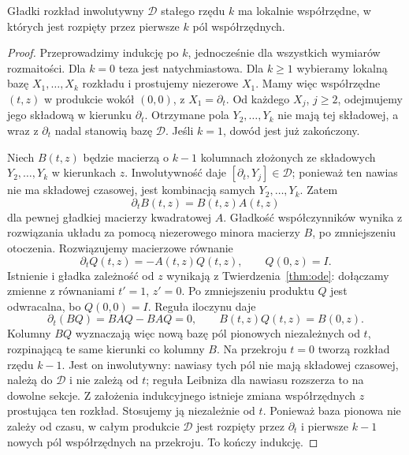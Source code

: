 \begin{stwierdzenie}
\label{prop:frobenius-lokalny}
Gładki rozkład inwolutywny $\mathcal D$ stałego rzędu $k$
ma lokalnie współrzędne, w których jest rozpięty przez pierwsze
$k$ pól współrzędnych.
\end{stwierdzenie}
\begin{proof}
Przeprowadzimy indukcję po $k$, jednocześnie dla wszystkich
wymiarów rozmaitości. Dla $k=0$ teza jest natychmiastowa.
Dla $k\ge1$ wybieramy lokalną bazę $X_1,\ldots,X_k$ rozkładu
i prostujemy niezerowe $X_1$. Mamy więc współrzędne $(t,z)$
w produkcie wokół $(0,0)$, z $X_1=\partial_t$.
Od każdego $X_j$, $j\ge2$, odejmujemy jego składową w kierunku
$\partial_t$. Otrzymane pola $Y_2,\ldots,Y_k$ nie mają tej
składowej, a wraz z $\partial_t$ nadal stanowią bazę $\mathcal D$.
Jeśli $k=1$, dowód jest już zakończony.

Niech $B(t,z)$ będzie macierzą o $k-1$ kolumnach złożonych
ze składowych $Y_2,\ldots,Y_k$ w kierunkach $z$.
Inwolutywność daje $[\partial_t,Y_j]\in\mathcal D$;
ponieważ ten nawias nie ma składowej czasowej, jest kombinacją
samych $Y_2,\ldots,Y_k$. Zatem
\[
 \partial_tB(t,z)=B(t,z)A(t,z)
\]
dla pewnej gładkiej macierzy kwadratowej $A$.
Gładkość współczynników wynika z rozwiązania układu za pomocą
niezerowego minora macierzy $B$, po zmniejszeniu otoczenia.
Rozwiązujemy macierzowe równanie
\[
 \partial_tQ(t,z)=-A(t,z)Q(t,z),\qquad Q(0,z)=I.
\]
Istnienie i gładka zależność od $z$ wynikają z
Twierdzenia~\ref{thm:ode}: dołączamy zmienne z równaniami
$t'=1$, $z'=0$. Po zmniejszeniu produktu $Q$ jest odwracalna,
bo $Q(0,0)=I$. Reguła iloczynu daje
\[
 \partial_t(BQ)=BAQ-BAQ=0,\qquad B(t,z)Q(t,z)=B(0,z).
\]
Kolumny $BQ$ wyznaczają więc nową bazę pól pionowych
niezależnych od $t$, rozpinającą te same kierunki co kolumny $B$.
Na przekroju $t=0$ tworzą rozkład rzędu $k-1$.
Jest on inwolutywny: nawiasy tych pól nie mają składowej
czasowej, należą do $\mathcal D$ i nie zależą od $t$;
reguła Leibniza dla nawiasu rozszerza to na dowolne sekcje.
Z założenia indukcyjnego istnieje zmiana współrzędnych $z$
prostująca ten rozkład. Stosujemy ją niezależnie od $t$.
Ponieważ baza pionowa nie zależy od czasu, w całym produkcie
$\mathcal D$ jest rozpięty przez $\partial_t$ i pierwsze
$k-1$ nowych pól współrzędnych na przekroju. To kończy indukcję.
\end{proof}

